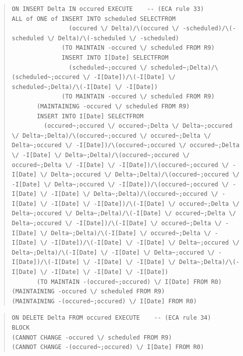 \documentclass[10pt,a4paper]{report}              %
\theoremstyle{plain}\theorembodyfont{\rmfamily}\newtheorem{definition}{Definition}[section]
\theoremstyle{plain}\theorembodyfont{\rmfamily}\newtheorem{designrule}[definition]{Requirement}
\begin{document}
\begin{quote}
\begin{verbatim}
ON INSERT Delta IN occured EXECUTE    -- (ECA rule 33)
ALL of ONE of INSERT INTO scheduled SELECTFROM
                (occured \/ Delta)/\(occured \/ -scheduled)/\(-scheduled \/ Delta)/\(-scheduled \/ -scheduled)
              (TO MAINTAIN -occured \/ scheduled FROM R9)
              INSERT INTO I[Date] SELECTFROM
                (scheduled~;occured \/ scheduled~;Delta)/\(scheduled~;occured \/ -I[Date])/\(-I[Date] \/ scheduled~;Delta)/\(-I[Date] \/ -I[Date])
              (TO MAINTAIN -occured \/ scheduled FROM R9)
       (MAINTAINING -occured \/ scheduled FROM R9)
       INSERT INTO I[Date] SELECTFROM
         (occured~;occured \/ occured~;Delta \/ Delta~;occured \/ Delta~;Delta)/\(occured~;occured \/ occured~;Delta \/ Delta~;occured \/ -I[Date])/\(occured~;occured \/ occured~;Delta \/ -I[Date] \/ Delta~;Delta)/\(occured~;occured \/ occured~;Delta \/ -I[Date] \/ -I[Date])/\(occured~;occured \/ -I[Date] \/ Delta~;occured \/ Delta~;Delta)/\(occured~;occured \/ -I[Date] \/ Delta~;occured \/ -I[Date])/\(occured~;occured \/ -I[Date] \/ -I[Date] \/ Delta~;Delta)/\(occured~;occured \/ -I[Date] \/ -I[Date] \/ -I[Date])/\(-I[Date] \/ occured~;Delta \/ Delta~;occured \/ Delta~;Delta)/\(-I[Date] \/ occured~;Delta \/ Delta~;occured \/ -I[Date])/\(-I[Date] \/ occured~;Delta \/ -I[Date] \/ Delta~;Delta)/\(-I[Date] \/ occured~;Delta \/ -I[Date] \/ -I[Date])/\(-I[Date] \/ -I[Date] \/ Delta~;occured \/ Delta~;Delta)/\(-I[Date] \/ -I[Date] \/ Delta~;occured \/ -I[Date])/\(-I[Date] \/ -I[Date] \/ -I[Date] \/ Delta~;Delta)/\(-I[Date] \/ -I[Date] \/ -I[Date] \/ -I[Date])
       (TO MAINTAIN -(occured~;occured) \/ I[Date] FROM R0)
(MAINTAINING -occured \/ scheduled FROM R9)
(MAINTAINING -(occured~;occured) \/ I[Date] FROM R0)
\end{verbatim}
\end{quote}
\begin{quote}
\begin{verbatim}
ON DELETE Delta FROM occured EXECUTE    -- (ECA rule 34)
BLOCK
(CANNOT CHANGE -occured \/ scheduled FROM R9)
(CANNOT CHANGE -(occured~;occured) \/ I[Date] FROM R0)
\end{verbatim}
\end{quote}
\end{document}
